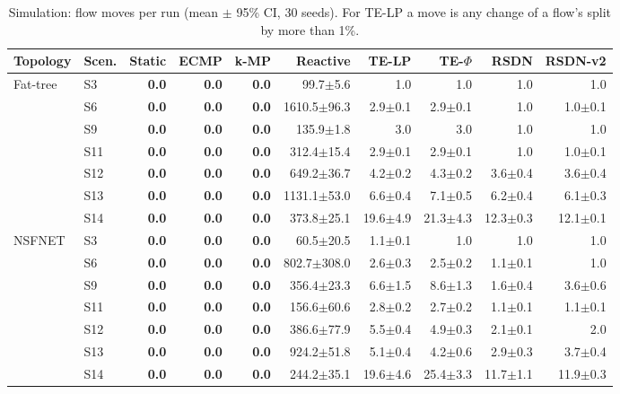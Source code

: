 \begin{table}[t]\centering\scriptsize
\caption{Simulation: flow moves per run (mean $\pm$ 95\% CI, 30 seeds). For TE-LP a move is any change of a flow's split by more than 1\%.}\label{tab:sim_reroutes}
\setlength{\tabcolsep}{3pt}
\begin{tabular}{llrrrrrrrr}
\toprule
Topology & Scen. & Static & ECMP & k-MP & Reactive & TE-LP & TE-$\Phi$ & RSDN & RSDN-v2\\
\midrule
Fat-tree & S3 & \textbf{0.0} & \textbf{0.0} & \textbf{0.0} & 99.7$\pm$5.6 & 1.0 & 1.0 & 1.0 & 1.0\\
 & S6 & \textbf{0.0} & \textbf{0.0} & \textbf{0.0} & 1610.5$\pm$96.3 & 2.9$\pm$0.1 & 2.9$\pm$0.1 & 1.0 & 1.0$\pm$0.1\\
 & S9 & \textbf{0.0} & \textbf{0.0} & \textbf{0.0} & 135.9$\pm$1.8 & 3.0 & 3.0 & 1.0 & 1.0\\
 & S11 & \textbf{0.0} & \textbf{0.0} & \textbf{0.0} & 312.4$\pm$15.4 & 2.9$\pm$0.1 & 2.9$\pm$0.1 & 1.0 & 1.0$\pm$0.1\\
 & S12 & \textbf{0.0} & \textbf{0.0} & \textbf{0.0} & 649.2$\pm$36.7 & 4.2$\pm$0.2 & 4.3$\pm$0.2 & 3.6$\pm$0.4 & 3.6$\pm$0.4\\
 & S13 & \textbf{0.0} & \textbf{0.0} & \textbf{0.0} & 1131.1$\pm$53.0 & 6.6$\pm$0.4 & 7.1$\pm$0.5 & 6.2$\pm$0.4 & 6.1$\pm$0.3\\
 & S14 & \textbf{0.0} & \textbf{0.0} & \textbf{0.0} & 373.8$\pm$25.1 & 19.6$\pm$4.9 & 21.3$\pm$4.3 & 12.3$\pm$0.3 & 12.1$\pm$0.1\\
\midrule
NSFNET & S3 & \textbf{0.0} & \textbf{0.0} & \textbf{0.0} & 60.5$\pm$20.5 & 1.1$\pm$0.1 & 1.0 & 1.0 & 1.0\\
 & S6 & \textbf{0.0} & \textbf{0.0} & \textbf{0.0} & 802.7$\pm$308.0 & 2.6$\pm$0.3 & 2.5$\pm$0.2 & 1.1$\pm$0.1 & 1.0\\
 & S9 & \textbf{0.0} & \textbf{0.0} & \textbf{0.0} & 356.4$\pm$23.3 & 6.6$\pm$1.5 & 8.6$\pm$1.3 & 1.6$\pm$0.4 & 3.6$\pm$0.6\\
 & S11 & \textbf{0.0} & \textbf{0.0} & \textbf{0.0} & 156.6$\pm$60.6 & 2.8$\pm$0.2 & 2.7$\pm$0.2 & 1.1$\pm$0.1 & 1.1$\pm$0.1\\
 & S12 & \textbf{0.0} & \textbf{0.0} & \textbf{0.0} & 386.6$\pm$77.9 & 5.5$\pm$0.4 & 4.9$\pm$0.3 & 2.1$\pm$0.1 & 2.0\\
 & S13 & \textbf{0.0} & \textbf{0.0} & \textbf{0.0} & 924.2$\pm$51.8 & 5.1$\pm$0.4 & 4.2$\pm$0.6 & 2.9$\pm$0.3 & 3.7$\pm$0.4\\
 & S14 & \textbf{0.0} & \textbf{0.0} & \textbf{0.0} & 244.2$\pm$35.1 & 19.6$\pm$4.6 & 25.4$\pm$3.3 & 11.7$\pm$1.1 & 11.9$\pm$0.3\\

\end{tabular}
\end{table}
